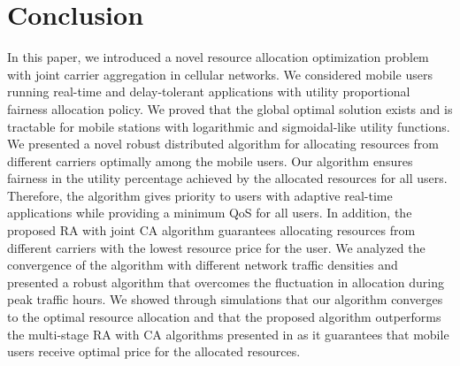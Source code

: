 \documentclass[journal]{IEEEtran} 		\usepackage{amsmath,amssymb}
\begin{document}
\section{Conclusion}\label{sec:conclude}
In this paper, we introduced a novel resource allocation optimization problem with joint carrier aggregation in cellular networks. We considered mobile users running real-time and delay-tolerant applications with utility proportional fairness allocation policy. We proved that the global optimal solution exists and is tractable for mobile stations with logarithmic and sigmoidal-like utility functions. We presented a novel robust distributed algorithm for allocating resources from different carriers optimally among the mobile users. Our algorithm ensures fairness in the utility percentage achieved by the allocated resources for all users. Therefore, the algorithm gives priority to users with adaptive real-time applications while providing a minimum QoS for all users. In addition, the proposed RA with joint CA algorithm guarantees allocating resources from different carriers with the lowest resource price for the user. We analyzed the convergence of the algorithm with different network traffic densities and
presented a robust algorithm that overcomes the fluctuation in allocation during peak traffic hours. We showed through simulations that our algorithm converges to the optimal resource allocation and that the proposed algorithm outperforms the multi-stage RA with CA algorithms presented in \cite{Haya_Utility1,Haya_Utility3,Haya_Utility6} as it guarantees that mobile users receive optimal price for the allocated resources.



\end{document}

